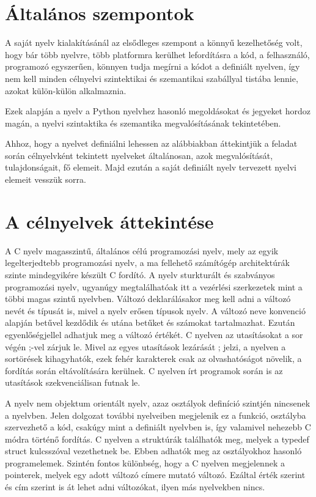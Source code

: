 
\section{Általános szempontok}

A saját nyelv kialakításánál az elsődleges szempont a könnyű kezelhetőség volt, hogy bár több nyelvre, több platformra kerülhet lefordításra a kód, a felhasználó, programozó egyszerűen, könnyen tudja megírni a kódot a definiált nyelven, így nem kell minden célnyelvi szintektikai és szemantikai szabállyal tistába lennie, azokat külön-külön alkalmaznia.

Ezek alapján a nyelv a Python nyelvhez hasonló megoldásokat és jegyeket hordoz magán, a nyelvi szintaktika és szemantika megvalósításának tekintetében.

Ahhoz, hogy a nyelvet definiálni lehessen az alábbiakban áttekintjük a feladat során célnyelvként tekintett nyelveket általánosan, azok megvalósítását, tulajdonságait, fő elemeit. Majd ezután a saját definiált nyelv tervezett nyelvi elemeit vesszük sorra.

\section{A célnyelvek áttekintése}

A C nyelv magasszintű, általános célú programozási nyelv, mely az egyik legelterjedtebb programozási nyelv, a ma fellehető számítógép architektúrák szinte mindegyikére készült C fordító. A nyelv sturkturált és szabványos programozási nyelv, ugyanúgy megtalálhatóak itt a vezérlési szerkezetek mint a többi magas szintű nyelvben. Változó deklarálásakor meg kell adni a változó nevét és típusát is, mivel a nyelv erősen típusok nyelv. A változó neve konvenció alapján betűvel kezdődik és utána betűket és számokat tartalmazhat. Ezután egyenlőségjellel adhatjuk meg a változó értékét. C nyelven az utasításokat a sor végén ;-vel zárjuk le. Mivel az egyes utasítások lezárását ; jelzi, a nyelven a sortörések kihagyhatók, ezek fehér karakterek csak az olvashatóságot növelik, a fordítás során eltávolítására kerülnek. C nyelven írt programok során is az utasítások szekvenciálisan futnak le.

A nyelv nem objektum orientált nyelv, azaz osztályok definíció szintjén nincsenek a nyelvben. Jelen dolgozat további nyelveiben megjelenik ez a funkció, osztályba szervezhető a kód, csakúgy mint a definiált nyelvben is, így valamivel nehezebb C módra történő fordítás. C nyelven a struktúrák találhatók meg, melyek a typedef struct kulcsszóval vezethetnek be. Ebben adhatók meg az osztályokhoz hasonló programelemek. Szintén fontos különbség, hogy a C nyelven megjelennek a pointerek, melyek egy adott változó címere mutató változó. Ezáltal érték szerint és cím szerint is át lehet adni változókat, ilyen más nyelvekben nincs.

